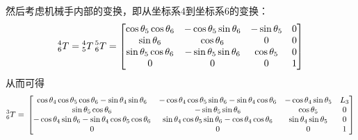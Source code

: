 \documentclass{ctexart}
\begin{document}
然后考虑机械手内部的变换，即从坐标系$4$到坐标系$6$的变换：
\[
    \prescript{4}{6}{T} = \prescript{4}{5}{T} \prescript{5}{6}{T} =
    \begin{bmatrix}\cos{ {{\theta }_5} } \cos{ {{\theta }_6} } & - \cos{ {{\theta }_5} } \sin{ {{\theta }_6} }  & -\sin{ {{\theta }_5} } & 0\\
        \sin{ {{\theta }_6} } & \cos{ {{\theta }_6} } & 0 & 0\\
        \sin{ {{\theta }_5} } \cos{ {{\theta }_6} } & - \sin{ {{\theta }_5} } \sin{ {{\theta }_6} }  & \cos{ {{\theta }_5} } & 0\\
        0 & 0 & 0 & 1
    \end{bmatrix}
\]
从而可得
\[
        \prescript{3}{6}{T} = \\
    \begin{bmatrix}\cos{{{\theta }_4} } \cos{ {{\theta }_5} } \cos{ {{\theta }_6} }-\sin{ {{\theta }_4} } \sin{ {{\theta }_6} } & - \cos{ {{\theta }_4} } \cos{ {{\theta }_5} } \sin{ {{\theta }_6} } -\sin{ {{\theta }_4} } \cos{ {{\theta }_6} } & - \cos{ {{\theta }_4} } \sin{ {{\theta }_5} }  & {L_3}\\
        \sin{ {{\theta }_5} } \cos{ {{\theta }_6} } & - \sin{ {{\theta }_5} } \sin{ {{\theta }_6} }  & \cos{ {{\theta }_5} } & 0\\
        - \cos{{{\theta }_4}} \sin{ {{\theta }_6} } -\sin{ {{\theta }_4} } \cos{ {{\theta }_5} } \cos{ {{\theta }_6} } & \sin{ {{\theta }_4} } \cos{ {{\theta }_5} } \sin{ {{\theta }_6} }-\cos{ {{\theta }_4} } \cos{ {{\theta }_6} } & \sin{ {{\theta }_4} } \sin{ {{\theta }_5} } & 0\\
        0 & 0 & 0 & 1
    \end{bmatrix}
\]
\end{document}
